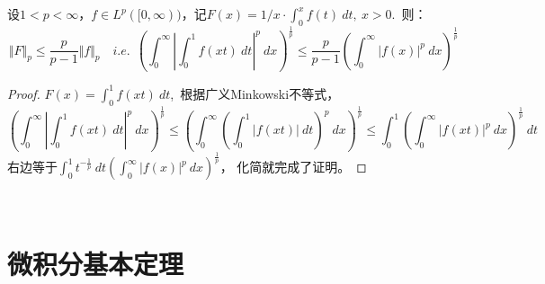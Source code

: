 \documentclass[color=green,thmcnt=section,lang=cn,12pt]{elegantbook}
\numberwithin{equation}{section}%
\numberwithin{figure}{section}%
\newcommand{\normp}[2]{\Vert #1 \Vert_{#2}}
\begin{document}
\begin{corollary}[Hardy]\label{hardybudengshi}
    设$1<p<\infty$，$f\in L^p([0,\infty))$，记$F(x)=1/x\cdot \int_{0}^{x}f(t)\ dt,\ x>0$.\ 则：
        \begin{equation*}
            \normp{F}{p}\leq \frac{p}{p-1}\normp{f}{p}\quad i.e.\ \ (\int_{0}^{\infty}\left\lvert \int_{0}^{1}f(xt)\ dt\right\rvert ^p\ dx)^{\frac{1}{p}}\leq \frac{p}{p-1}(\int_{0}^{\infty}|f(x)|^p\ dx)^{\frac{1}{p}}
        \end{equation*}
\end{corollary}
\begin{proof}
    $F(x)=\int_{0}^{1}f(xt)\ dt$,\ 根据广义Minkowski不等式，
    \begin{equation*}
        (\int_{0}^{\infty}\left\lvert \int_{0}^{1}f(xt)\ dt\right\rvert ^p\ dx)^{\frac{1}{p}}\leq
        (\int_{0}^{\infty}(\int_{0}^{1}|f(xt)|\ dt)^p\ dx)^{\frac{1}{p}}\leq \int_{0}^{1}(\int_{0}^{\infty}|f(xt)|^p\ dx)^{\frac{1}{p}}\ dt
    \end{equation*}
    右边等于$\int_{0}^{1}t^{-\frac{1}{p}}\ dt(\int_{0}^{\infty}|f(x)|^p\ dx)^{\frac{1}{p}}$，
    化简就完成了证明。
\end{proof}
\ 


\chapter{微积分基本定理}
\end{document}
